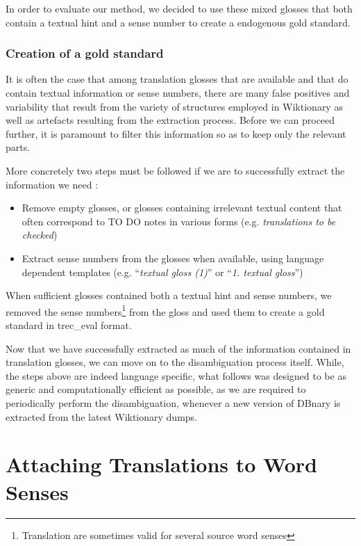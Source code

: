 \documentclass[10pt,a4paper,twoside]{article}
\begin{document}
In order to evaluate our method, we decided to use these mixed glosses that both contain a textual hint and a sense number to create a endogenous gold standard.

\subsubsection{Creation of a gold standard}

It is often the case that among translation glosses that are available and that do contain textual information or sense numbers, there are many false positives and variability that result from the variety of structures employed in Wiktionary as well as artefacts resulting from the extraction process. Before we can proceed further, it is paramount to filter this information so as to keep only the relevant parts. 

More concretely two steps must be followed if we are to successfully extract the information we need :
\begin{itemize}
   \item Remove empty glosses, or glosses containing irrelevant textual content that often correspond to TO DO notes in various forms (e.g. \emph{translations to be checked})
   \item Extract sense numbers from the glosses when available, using language dependent templates (e.g. ``\emph{textual gloss (1)}'' or ``\emph{1. textual gloss}'') 
\end{itemize}

When sufficient glosses contained both a textual hint and sense numbers, we removed the sense numbers\footnote{Translation are sometimes valid for several source word senses} from the gloss and used them to create a gold standard in trec\_eval format.

Now that we have successfully extracted as much of the information contained in translation glosses, we can move on to the disambiguation process itself. While, the steps above are indeed language specific, what follows was designed to be as generic and computationally efficient as possible, as we are required to periodically perform the disambiguation, whenever a new version of DBnary is extracted from the latest Wiktionary dumps.



\section{Attaching Translations to Word Senses}
\end{document}
